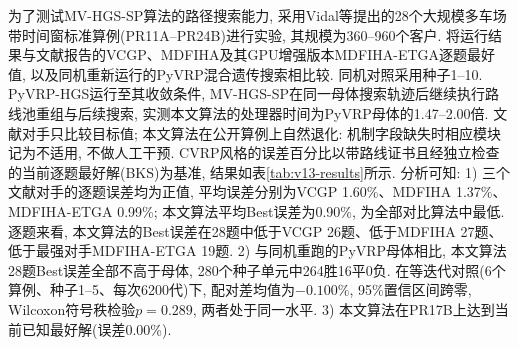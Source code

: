 \documentclass{setp-new}
\begin{document}
为了测试MV-HGS-SP算法的路径搜索能力,
采用Vidal等\cite{ref:74}提出的28个大规模多车场带时间窗标准算例(PR11A--PR24B)进行实验,
其规模为360--960个客户.
将运行结果与文献报告的VCGP\cite{ref:74}、MDFIHA及其GPU增强版本MDFIHA-ETGA\cite{ref:75}逐题最好值,
以及同机重新运行的PyVRP混合遗传搜索\cite{ref:64}相比较.
同机对照采用种子1--10. PyVRP-HGS运行至其收敛条件,
MV-HGS-SP在同一母体搜索轨迹后继续执行路线池重组与后续搜索,
实测本文算法的处理器时间为PyVRP母体的1.47--2.00倍.
文献对手只比较目标值;
本文算法在公开算例上自然退化: 机制字段缺失时相应模块记为不适用, 不做人工干预.
CVRP风格的误差百分比以带路线证书且经独立检查的当前逐题最好解(BKS)为基准,
结果如表\ref{tab:v13-results}所示.
分析可知:
1) 三个文献对手的逐题误差均为正值, 平均误差分别为VCGP 1.60\%、MDFIHA 1.37\%、
MDFIHA-ETGA 0.99\%; 本文算法平均Best误差为0.90\%, 为全部对比算法中最低.
逐题来看, 本文算法的Best误差在28题中低于VCGP 26题、低于MDFIHA 27题、
低于最强对手MDFIHA-ETGA 19题.
2) 与同机重跑的PyVRP母体相比, 本文算法28题Best误差全部不高于母体, 280个种子单元中264胜16平0负.
在等迭代对照(6个算例、种子1--5、每次6200代)下, 配对差均值为$-0.100\%$,
95\%置信区间跨零, Wilcoxon符号秩检验$p=0.289$, 两者处于同一水平.
3) 本文算法在PR17B上达到当前已知最好解(误差0.00\%).
\end{document}
